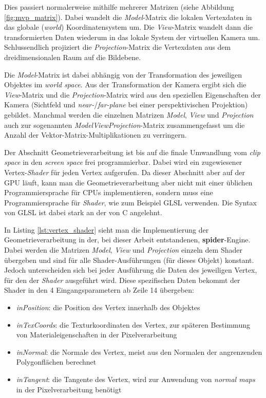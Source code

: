 \documentclass[oneside]{ausarbeitung}
\begin{document}
Dies passiert normalerweise mithilfe mehrerer Matrizen (siehe Abbildung \ref{fig:mvp_matrix}). Dabei wandelt die \textit{Model}-Matrix die lokalen Vertexdaten in das globale (\textit{world}) Koordinatensystem um. Die \textit{View}-Matrix wandelt dann die transformierten Daten wiederum in das lokale System der virtuellen Kamera um. Schlussendlich projiziert die \textit{Projection}-Matrix die Vertexdaten aus dem dreidimensionalen Raum auf die Bildebene. 

Die \textit{Model}-Matrix ist dabei abhängig von der Transformation des jeweiligen Objektes im \textit{world space}. Aus der Transformation der Kamera ergibt sich die \textit{View}-Matrix und die \textit{Projection}-Matrix wird aus den speziellen Eigenschaften der Kamera (Sichtfeld und \textit{near-}/\textit{far-plane} bei einer perspektivischen Projektion) gebildet. Manchmal werden die einzelnen Matrizen \textit{Model}, \textit{View} und \textit{Projection} auch zur sogenannten \textit{ModelViewProjection}-Matrix zusammengefasst um die Anzahl der Vektor-Matrix-Multiplikationen zu verringern.

Der Abschnitt Geometrieverarbeitung ist bis auf die finale Umwandlung vom \textit{clip space} in den \textit{screen space} frei programmierbar. Dabei wird ein zugewiesener Vertex-\textit{Shader} für jeden Vertex aufgerufen. Da dieser Abschnitt aber auf der \ac{GPU} läuft, kann man die Geometrieverarbeitung aber nicht mit einer üblichen Programmiersprache für \ac{CPU}s implementieren, sondern muss eine Programmiersprache für \textit{Shader}, wie zum Beispiel GLSL verwenden. Die Syntax von \ac{GLSL} ist dabei stark an der von C angelehnt. 

In Listing \ref{lst:vertex_shader} sieht man die Implementierung der Geometrieverarbeitung in der, bei dieser Arbeit entstandenen, \textbf{spider}-Engine. Dabei werden die Matrizen \textit{Model}, \textit{View} und \textit{Projection} einzeln dem Shader übergeben und sind für alle Shader-Ausführungen (für dieses Objekt) konstant. Jedoch unterscheiden sich bei jeder Ausführung die Daten des jeweiligen Vertex, für den der \textit{Shader }ausgeführt wird. Diese spezifischen Daten bekommt der Shader in den 4 Eingangsparametern ab Zeile 14 übergeben:
\begin{itemize}
\item{\textit{inPosition}: die Position des Vertex innerhalb des Objektes}
\item{\textit{inTexCoords}: die Texturkoordinaten des Vertex, zur späteren Bestimmung von Materialeigenschaften in der Pixelverarbeitung}
\item{\textit{inNormal}: die Normale des Vertex, meist aus den Normalen der angrenzenden Polygonflächen berechnet}
\item{\textit{inTangent}: die Tangente des Vertex, wird zur Anwendung von \textit{normal maps} in der Pixelverarbeitung benötigt}
\end{itemize}
\end{document}
